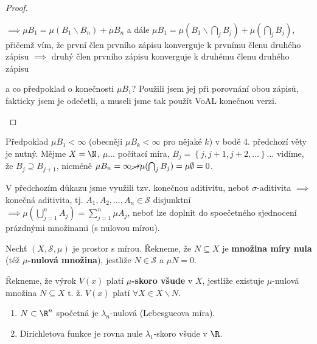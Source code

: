 \begin{proof}
\begin{enumerate}[{ad} 1.]
          $\implies \mu B_1 = \mu \left(B_1 \smallsetminus B_n\right)+\mu B_n$ a dále $\mu B_1 = \mu \left(B_1 \smallsetminus \bigcap_j B_j\right)+\mu \left(\bigcap_j B_j\right)$, přičemž vím, že první člen prvního zápisu konverguje k prvnímu členu druhého zápisu $\implies$ druhý člen prvního zápisu konverguje k druhému členu druhého zápisu

          a co předpoklad o konečnosti $\mu B_1$? Použili jsem jej při porovnání obou zápisů, fakticky jsem je odečetli, a museli jsme tak použít VoAL konečnou verzi. \qedhere
  \end{enumerate}
\end{proof}

\begin{priklad}
    Předpoklad $\mu B_1<\infty$ (obecněji $\mu B_k<\infty$ pro nějaké $k$) v bodě 4. předchozí věty je nutný. Mějme $X=\N$, $\mu\dots$ počítací míra, $B_j=\left\{j, j+1, j+2, \dots\right\}\dots$ vidíme, že $B_j \supseteq B_{j+1}$, nicméně $\mu B_n = \infty \cancel{\to} \mu (\bigcap_j B_j) = \mu\emptyset = 0$.
\end{priklad}

\begin{poznamka}
    V předchozím důkazu jsme využili tzv. konečnou aditivitu, neboť $\sigma$-aditivita $\implies$ konečná aditivita, tj. $A_1, A_2, \dots, A_n \in \mathscr S$ disjunktní $\implies \mu \left(\bigcup_{j=1}^n A_j\right) = \sum_{j=1}^n \mu A_j$, neboť lze doplnit do spoečetného sjednocení prázdnými množinami (s nulovou mírou).
\end{poznamka}

\begin{definice}
    Nechť $(X, \mathscr S, \mu)$ je prostor s mírou. Řekneme, že $N\subseteq X$ je \textbf{množina míry nula} (též \textbf{$\mu$-nulová množina}), jestliže $N\in \mathscr S$ a $\mu N = 0$.

    Řekneme, že výrok $V(x)$ platí \textbf{$\mu$-skoro všude} v $X$, jestliže existuje $\mu$-nulová množina $N\subseteq X$ t. ž. $V(x)$ platí $\forall X \in X \smallsetminus N$.
\end{definice}

\begin{priklad}
    \begin{enumerate}[1.]
    \item $N\subset \R^n$ spočetná je $\lambda_n$-nulová (Lebesgueova míra).
    \item Dirichletova funkce je rovna nule $\lambda_1$-skoro všude v $\R$.
    \end{enumerate}
\end{priklad}

